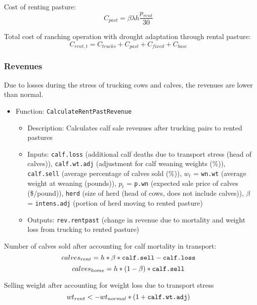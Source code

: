 \documentclass[11pt]{article}
\begin{document}
Cost of renting pasture:
\begin{equation}
C_{past} = \beta \lambda h  \frac{p_{rent}}{30} 
\end{equation}

Total cost of ranching operation with drought adaptation through rental pasture:
\begin{equation}
C_{rent,t} = C_{trucks} + C_{past} + C_{fixed} + C_{base}
\end{equation}


\subsubsection{Revenues}
Due to losses during the stress of trucking cows and calves, the revenues are lower than normal.

\begin{itemize}
\item Function: \verb!CalculateRentPastRevenue!
	\begin{itemize}
	\item Description: Calculates calf sale revenues after trucking pairs to rented pastures
	\item Inputs: \verb!calf.loss! (additional calf deaths due to transport stress (head of calves)), \verb!calf.wt.adj! (adjustment for calf weaning weights (\%)), \verb!calf.sell! (average percentage of calves sold (\%)), $w_t$ = \verb!wn.wt! (average weight at weaning (pounds)), $p_t$ = \verb!p.wn! (expected sale price of calves (\$/pound)), \verb!herd! (size of herd (head of cows, does not include calves)), $\beta$ = \verb!intens.adj! (portion of herd moving to rented pasture)
  \item Outputs: \verb!rev.rentpast! (change in revenue due to mortality and weight loss from trucking to rented pasture)
	\end{itemize}
\end{itemize}	 

Number of calves sold after accounting for calf mortality in transport:
\begin{equation} 
calves_{rent} = h * \beta * \verb!calf.sell! - \verb!calf.loss!
\end{equation}
\begin{equation}
calves_{home} = h * (1-\beta) * \verb!calf.sell!
\end{equation}
  
Selling weight after accounting for weight loss due to transport stress
\begin{equation}
wt_{rent} <- wt_{normal} * (1 + \verb!calf.wt.adj!)
\end{equation}
  
\end{document}
